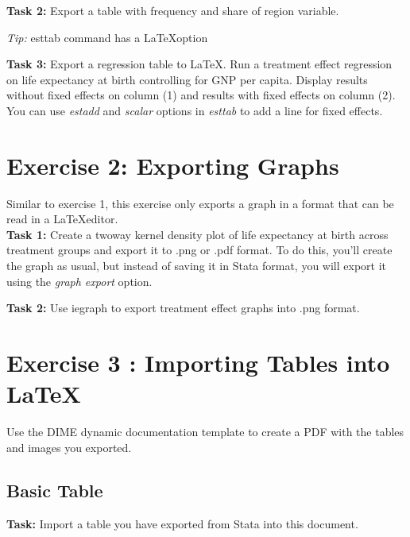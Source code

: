 \documentclass[12pts]{report}
\newenvironment{centerverbatim}{%
	\par
	\centering
	\varwidth{\linewidth}%
	\verbatim
}{%
	\endverbatim
	\endvarwidth
	\par
}
\begin{document}
\textbf{Task 2:}  Export a table with frequency and share of region variable. 
\begin{center}
	\colorbox{BurntOrange}{\emph{Tip:} esttab command has a \LaTeX\space option}
\end{center}

\textbf{Task 3:} Export a regression table to \LaTeX. Run a treatment effect regression on life expectancy at birth controlling for GNP per capita. Display results without fixed effects on column (1) and results with fixed effects on column (2). You can use \textit{estadd} and \textit{scalar} options in \textit{esttab} to add a line for fixed effects.

\section*{Exercise 2: Exporting Graphs}
Similar to exercise 1, this exercise only exports a graph in a format that can be read in a \LaTeX\space editor. \\

\textbf{Task 1:}  Create a twoway kernel density plot of life expectancy at birth across treatment groups and export it to .png or .pdf format. To do this, you'll create the graph as usual, but instead of saving it in Stata format, you will export it using the \textit{graph export} option. 

\textbf{Task 2:}  Use iegraph to export treatment effect graphs into .png format.

\section*{Exercise 3 : Importing Tables into \LaTeX}
Use the DIME dynamic documentation template to create a PDF with the tables and images you exported.

\subsection*{Basic Table}

\textbf{Task:} Import a table you have exported from Stata into this document.
\begin{centerverbatim}

\end{centerverbatim}
		
	
\end{document}
